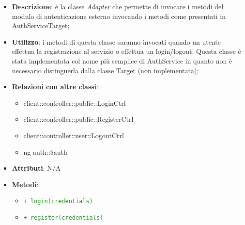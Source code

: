 			\begin{itemize}
				\item \textbf{Descrizione}: è la classe \emph{Adapter} che permette di invocare i metodi del modulo di autenticazione esterno invocando i metodi come presentati in AuthServiceTarget;
				\item \textbf{Utilizzo}:  i metodi di questa classe saranno invocati quando un utente effettua la registrazione al servizio o effettua un login/logout. Questa classe è stata implementata col nome più semplice di AuthService in quanto non è necessario distinguerla dalla classe Target (non implementata);
				\item \textbf{Relazioni con altre classi}:
					\begin{itemize}
						\item client::controller::public::LoginCtrl
						\item client::controller::public::RegisterCtrl
						\item client::controller::user::LogoutCtrl
						\item ng-auth::\$auth
					\end{itemize}
				\item \textbf{Attributi}: N/A
				\item \textbf{Metodi}:
				\begin{itemize}
					\item \textcolor{forestgreen}{\texttt{+ login(credentials)}}
					\item \textcolor{forestgreen}{\texttt{+ register(credentials)}}

\end{itemize}
\end{itemize}
